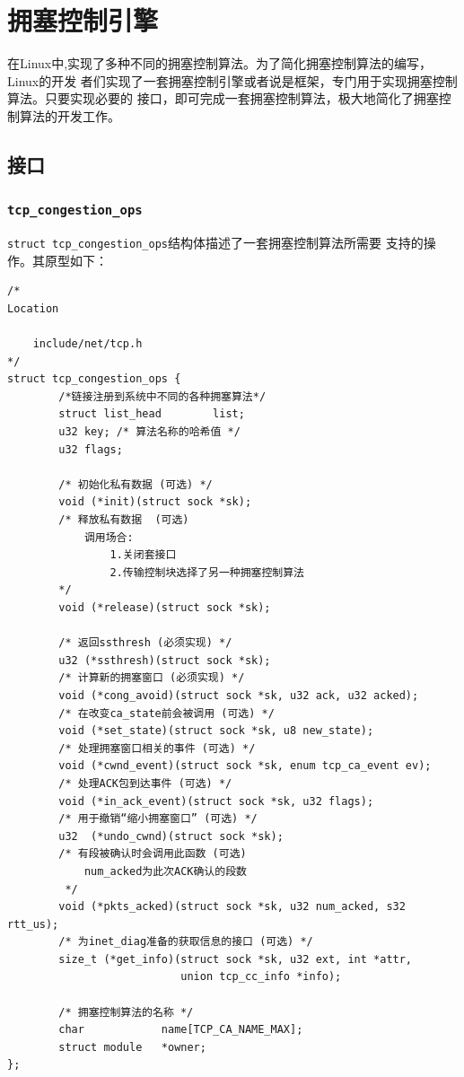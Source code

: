 \section{拥塞控制引擎}
\label{sec:congestion_control_engine}
在Linux中,实现了多种不同的拥塞控制算法。为了简化拥塞控制算法的编写，Linux的开发
者们实现了一套拥塞控制引擎或者说是框架，专门用于实现拥塞控制算法。只要实现必要的
接口，即可完成一套拥塞控制算法，极大地简化了拥塞控制算法的开发工作。

\subsection{接口}
\label{subsec:congestion_control_interface}

\subsubsection{\texttt{tcp_congestion_ops}}
\texttt{struct tcp_congestion_ops}结构体描述了一套拥塞控制算法所需要
支持的操作。其原型如下：
\begin{verbatim}
/*
Location

	include/net/tcp.h
*/
struct tcp_congestion_ops {
		/*链接注册到系统中不同的各种拥塞算法*/
        struct list_head        list;
        u32 key; /* 算法名称的哈希值 */
        u32 flags;

        /* 初始化私有数据 (可选) */
        void (*init)(struct sock *sk);
        /* 释放私有数据  (可选) 
			调用场合:
				1.关闭套接口
				2.传输控制块选择了另一种拥塞控制算法
		*/
        void (*release)(struct sock *sk);

        /* 返回ssthresh (必须实现) */
        u32 (*ssthresh)(struct sock *sk);
        /* 计算新的拥塞窗口 (必须实现) */
        void (*cong_avoid)(struct sock *sk, u32 ack, u32 acked);
        /* 在改变ca_state前会被调用 (可选) */
        void (*set_state)(struct sock *sk, u8 new_state);
        /* 处理拥塞窗口相关的事件 (可选) */
        void (*cwnd_event)(struct sock *sk, enum tcp_ca_event ev);
        /* 处理ACK包到达事件 (可选) */
        void (*in_ack_event)(struct sock *sk, u32 flags);
        /* 用于撤销“缩小拥塞窗口” (可选) */
        u32  (*undo_cwnd)(struct sock *sk);
        /* 有段被确认时会调用此函数 (可选)
			num_acked为此次ACK确认的段数
		 */
        void (*pkts_acked)(struct sock *sk, u32 num_acked, s32 rtt_us);
        /* 为inet_diag准备的获取信息的接口 (可选) */
        size_t (*get_info)(struct sock *sk, u32 ext, int *attr,
                           union tcp_cc_info *info);

        /* 拥塞控制算法的名称 */
        char            name[TCP_CA_NAME_MAX];
        struct module   *owner;
};
\end{verbatim}


